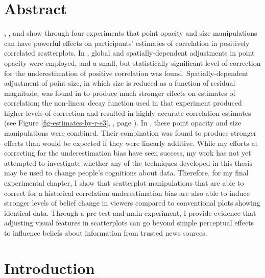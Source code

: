 \documentclass[../main.tex]{subfiles}
\begin{document}
\section{Abstract}\label{abstract-beliefs}

, , and
 show through four experiments that
point opacity and size manipulations can have powerful effects on
participants' estimates of correlation in positively correlated
scatterplots. In , global and
spatially-dependent adjustments in point opacity were employed, and a
small, but statistically significant level of correction for the
underestimation of positive correlation was found. Spatially-dependent
adjustment of point size, in which size is reduced as a function of
residual magnitude, was found in  to produce
much stronger effects on estimates of correlation; the non-linear decay
function used in that experiment produced higher levels of correction
and resulted in highly accurate correlation estimates (see Figure
\ref{fig-estimates-by-r-e3}, , page
\pageref{fig-estimates-by-r-e3}). In
, these point opacity and size
manipulations were combined. Their combination was found to produce
stronger effects than would be expected if they were linearly additive.
While my efforts at correcting for the underestimation bias have seen
success, my work has not yet attempted to investigate whether any of the
techniques developed in this thesis may be used to change people's
cognitions about data. Therefore, for my final experimental chapter, I
show that scatterplot manipulations that are able to correct for a
historical correlation underestimation bias are also able to induce
stronger levels of belief change in viewers compared to conventional
plots showing identical data. Through a pre-test and main experiment, I
provide evidence that adjusting visual features in scatterplots can go
beyond simple perceptual effects to influence beliefs about information
from trusted news sources.

\section{Introduction}\label{intro-beliefs}
\end{document}
